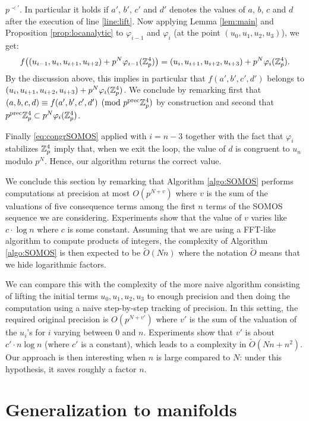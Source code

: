 \documentclass{lms}
\begin{document}
$p^{\prec'}$. In particular it holds if $a'$, $b'$, $c'$ and $d'$ denotes
the values of $a$, $b$, $c$ and $d$ after the execution of line
\ref{line:lift}. Now applying Lemma \ref{lem:main} and Proposition
\ref{prop:locanalytic} to $\varphi_{i-1}$ and $\varphi_i$ (at the point 
$(u_0, u_1, u_2, u_3)$), we get:
$$f\big((u_{i-1}, u_i, u_{i+1}, u_{i+2}) + p^N \varphi_{i-1}(\mathbb Z_p^4)\big)
= (u_i, u_{i+1}, u_{i+2}, u_{i+3}) + p^N \varphi_i(\mathbb Z_p^4).$$
By the discussion above, this implies in particular that $f(a',b',c',d')$
belongs to $(u_i, u_{i+1}, u_{i+2}, u_{i+3}) + p^N \varphi_i(\mathbb Z_p^4)$. We
conclude by remarking first that $(a,b,c,d) \equiv f(a',b',c',d') \pmod 
{p^{\text{\rm prec}} \mathbb Z_p^4}$ by construction and second that $p^{\text{\rm prec}} \mathbb Z_p^4 \subset
p^N \varphi_i(\mathbb Z_p^4)$.

Finally \eqref{eq:congrSOMOS} applied with $i = n-3$ together with
the fact that $\varphi_i$ stabilizes $\mathbb Z_p^4$ imply that, when we exit
the loop, the value of $d$ is congruent to $u_n$ modulo $p^N$. Hence,
our algorithm returns the correct value.

\medskip

We conclude this section by remarking that Algorithm 
\ref{algo:SOMOS} performs computations at precision at most $O(p^{N+v})$ 
where $v$ is the sum of the valuations of five consequence terms among 
the first $n$ terms of the SOMOS sequence we are considering. 
Experiments show that the value of $v$ varies like $c \cdot \log n$ 
where $c$ is some constant. Assuming that we are using a FFT-like 
algorithm to compute products of integers, the complexity of Algorithm 
\ref{algo:SOMOS} is then expected to be $\tilde O(N n)$ where the 
notation $\tilde O$ means that we hide logarithmic factors.

We can compare this with the complexity of the more naive algorithm 
consisting of lifting the initial terms $u_0, u_1, u_2, u_3$ to enough 
precision and then doing the computation using a naive step-by-step 
tracking of precision. In this setting, the required original precision 
is $O(p^{N+v'})$ where $v'$ is the sum of the valuation of the $u_i$'s 
for $i$ varying between $0$ and $n$. Experiments show that $v'$ is about 
$c' \cdot n \log n$ (where $c'$ is a constant), which leads to a 
complexity in $\tilde O (N n + n^2)$. Our approach is then interesting
when $n$ is large compared to $N$: under this hypothesis, it saves
roughly a factor $n$.

\appendix

\section{Generalization to manifolds}
\label{sec:manifold}
\end{document}
